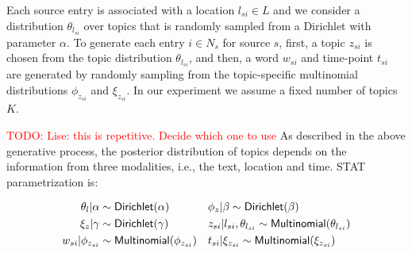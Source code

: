 \documentclass[conference]{IEEEtran}
\newcommand{\model}{{STAT}\xspace} %
\newcommand{\todo}[1]{\textcolor{red}{{TODO: #1}}}
\begin{document}
Each source entry is associated with a location $l_{si} \in L$ and we consider a distribution $\theta_{l_{si}}$ over topics that is randomly sampled from a Dirichlet with parameter $\alpha$. To generate each entry $i \in N_s$ for source $s$, first, a topic $z_{si}$ is chosen from the topic distribution $\theta_{l_{si}}$, and then, a word $w_{si}$ and time-point $t_{si}$ are generated by randomly sampling from the topic-specific multinomial distributions $\phi_{z_{si}}$ and $\xi_{z_{si}}$.  In our experiment we assume a fixed number of topics $K$.

\todo{Lise: this is repetitive. Decide which one to use} As described in the above generative process, the posterior distribution of topics depends on the information from three modalities, i.e., the text, location and time. \model parametrization is:

{\small
\begin{align}
\theta_{l}|\alpha & \sim {\sf Dirichlet}(\alpha) &&  \phi_{z}|\beta \sim {\sf Dirichlet}(\beta) \nonumber \\
\xi_{z}|\gamma & \sim {\sf Dirichlet}(\gamma) &&  z_{si}|l_{si},\theta_{l_{si}} \sim {\sf Multinomial}(\theta_{l_{si}}) \nonumber \\
w_{si}|\phi_{z_{si}} & \sim {\sf Multinomial}(\phi_{z_{si}}) && t_{si}|\xi_{z_{si}} \sim {\sf Multinomial}(\xi_{z_{si}}) \nonumber
\end{align}}
\end{document}
